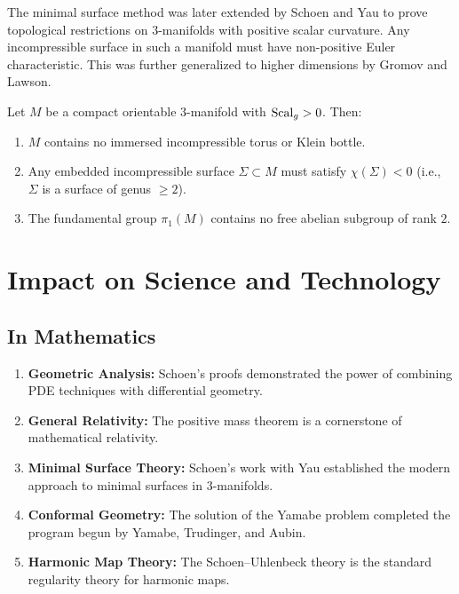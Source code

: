 \begin{remark}
The minimal surface method was later extended by Schoen and Yau to prove topological restrictions on $3$-manifolds with positive scalar curvature. Any incompressible surface in such a manifold must have non-positive Euler characteristic. This was further generalized to higher dimensions by Gromov and Lawson.
\end{remark}

\begin{theorem}
Let $M$ be a compact orientable $3$-manifold with $\operatorname{Scal}_g > 0$. Then:
\begin{enumerate}
    \item $M$ contains no immersed incompressible torus or Klein bottle.
    \item Any embedded incompressible surface $\Sigma \subset M$ must satisfy $\chi(\Sigma) < 0$ (i.e., $\Sigma$ is a surface of genus $\geq 2$).
    \item The fundamental group $\pi_1(M)$ contains no free abelian subgroup of rank $2$.
\end{enumerate}
\end{theorem}

\section{Impact on Science and Technology}

\subsection{In Mathematics}

\begin{enumerate}
    \item \textbf{Geometric Analysis:} Schoen's proofs demonstrated the power of combining PDE techniques with differential geometry.
    \item \textbf{General Relativity:} The positive mass theorem is a cornerstone of mathematical relativity.
    \item \textbf{Minimal Surface Theory:} Schoen's work with Yau established the modern approach to minimal surfaces in 3-manifolds.
    \item \textbf{Conformal Geometry:} The solution of the Yamabe problem completed the program begun by Yamabe, Trudinger, and Aubin.
    \item \textbf{Harmonic Map Theory:} The Schoen--Uhlenbeck theory is the standard regularity theory for harmonic maps.
\end{enumerate}

